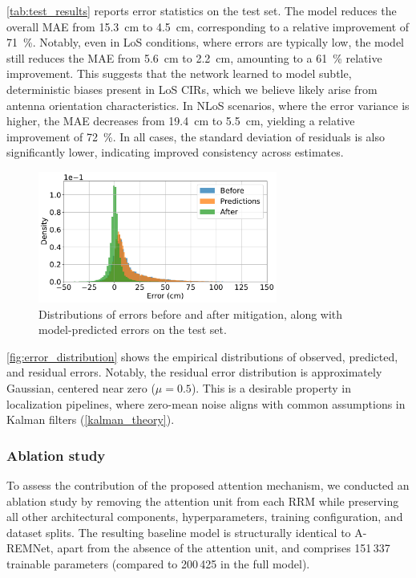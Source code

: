 \autoref{tab:test_results} reports error statistics on the test set. The model reduces the overall MAE from \SI{15.3}{\centi\metre} to \SI{4.5}{\centi\metre}, corresponding to a relative improvement of \SI{71}{\percent}. Notably, even in LoS conditions, where errors are typically low, the model still reduces the MAE from \SI{5.6}{\centi\metre} to \SI{2.2}{\centi\metre}, amounting to a \SI{61}{\percent} relative improvement. This suggests that the network learned to model subtle, deterministic biases present in LoS CIRs, which we believe likely arise from antenna orientation characteristics. In NLoS scenarios, where the error variance is higher, the MAE decreases from \SI{19.4}{\centi\metre} to \SI{5.5}{\centi\metre}, yielding a relative improvement of \SI{72}{\percent}. In all cases, the standard deviation of residuals is also significantly lower, indicating improved consistency across estimates.

\begin{figure}[tbh] 
\centering 
\includegraphics[width=0.7\textwidth]{Figures/experiments_and_results/model_error_distribution.pdf} 
\caption[Distributions of errors before and after mitigation.]{Distributions of errors before and after mitigation, along with model-predicted errors on the test set.} \label{fig:error_distribution} 
\end{figure}

\autoref{fig:error_distribution} shows the empirical distributions of observed, predicted, and residual errors. Notably, the residual error distribution is approximately Gaussian, centered near zero ($\mu = 0.5$). This is a desirable property in localization pipelines, where zero-mean noise aligns with common assumptions in Kalman filters (\autoref{kalman_theory}).

\subsubsection{Ablation study}
To assess the contribution of the proposed attention mechanism, we conducted an ablation study by removing the attention unit from each RRM while preserving all other architectural components, hyperparameters, training configuration, and dataset splits. The resulting baseline model is structurally identical to A-REMNet, apart from the absence of the attention unit, and comprises 151\,337 trainable parameters (compared to 200\,425 in the full model).

